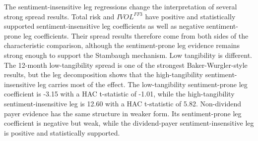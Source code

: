 \documentclass[11pt]{article}
\newcommand{\var}[1]{\ensuremath{#1}}
\begin{document}
The sentiment-insensitive leg regressions change the interpretation of several strong spread results. Total risk and \var{IVOL^{FF3}} have positive and statistically supported sentiment-insensitive leg coefficients as well as negative sentiment-prone leg coefficients. Their spread results therefore come from both sides of the characteristic comparison, although the sentiment-prone leg evidence remains strong enough to support the Stambaugh mechanism. Low tangibility is different. The 12-month low-tangibility spread is one of the strongest Baker-Wurgler-style results, but the leg decomposition shows that the high-tangibility sentiment-insensitive leg carries most of the effect. The low-tangibility sentiment-prone leg coefficient is -3.15 with a HAC t-statistic of -1.01, while the high-tangibility sentiment-insensitive leg is 12.60 with a HAC t-statistic of 5.82. Non-dividend payer evidence has the same structure in weaker form. Its sentiment-prone leg coefficient is negative but weak, while the dividend-payer sentiment-insensitive leg is positive and statistically supported.
\end{document}
